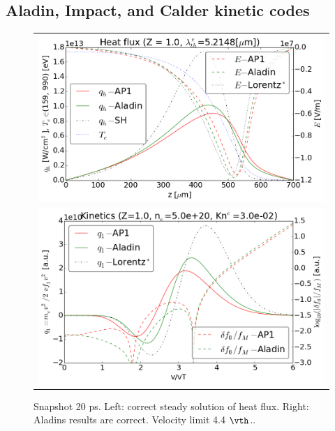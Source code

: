 \subsection{Aladin, Impact, and Calder kinetic codes}
\label{sec:AladinImpactCaldercodes}

\begin{figure}[tbh]
  \begin{center}
    \begin{tabular}{c}
      \includegraphics[width=\figscale\textwidth]{../VFPdata/C7_Aladin_case5_heatflux.png} \\
      \includegraphics[width=\figscale\textwidth]{../VFPdata/C7_Aladin_case5_kinetics.png}
    \end{tabular}
  \caption{  
  Snapshot 20 ps. Left: correct steady solution of heat flux. 
  Right: Aladins results are correct. Velocity limit 4.4 $\vth$..
  }
  \label{fig:C7_Aladin_case5}
  \end{center} 
\end{figure}



